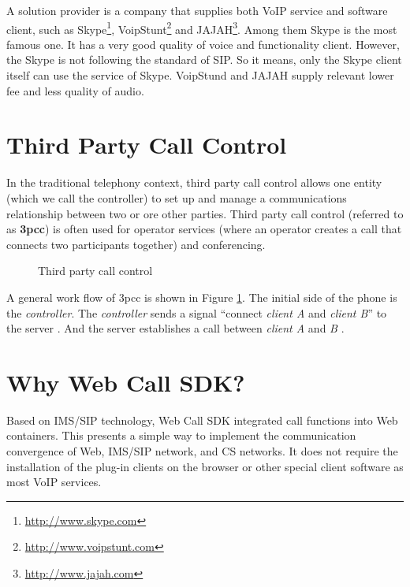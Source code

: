 A solution provider is a company that supplies both VoIP service and software client, such as \textsf{Skype}\texttrademark{}\footnote{\url{http://www.skype.com}}, \textsf{VoipStunt}\footnote{\url{http://www.voipstunt.com}} and JAJAH\footnote{\url{http://www.jajah.com}}.  Among them \textsf{Skype} is the most famous one. It has a very good quality of voice and functionality client. However, the \textsf{Skype} is not following the standard of SIP. So it means, only the \textsf{Skype} client itself can use the service of \textsf{Skype}. \textsf{VoipStund} and \textsf{JAJAH} supply relevant lower fee and less quality of audio.


\section{Third Party Call Control}
\label{sec:BackgroundStudy:ThirdPartyCallControl}

In the traditional telephony context, third party call control allows one entity (which we call the controller) to set up and manage a communications relationship between two or ore other parties.  Third party call control (referred to as \textbf{3pcc}\label{sym:3pcc}) is often used for operator services (where an operator creates a call that connects two participants together) and conferencing.\cite{RFC3725}

\begin{figure}[!hbtp]
\centering
{}
\caption{Third party call control}
\label{fig:ThirdPartyCallControl}
\end{figure}

A general work flow of 3pcc is shown in Figure \ref{fig:ThirdPartyCallControl}. The initial side of the phone is the \textit{controller}. The \textit{controller} sends a signal ``connect \textit{client \nolinebreak A} and \textit{client \nolinebreak B}'' to the server \hyperref[fig:ThirdPartyCallControl]{}. And the server establishes a call between \textit{client A} and \textit{B} \hyperref[fig:ThirdPartyCallControl]{}.


\section{Why Web Call SDK?}
\label{sec:BackgroundStudy:WhyWebCallSDK}

Based on IMS/SIP technology, Web Call SDK integrated call functions into Web containers. This presents a simple way to implement the communication convergence of Web, IMS/SIP network, and CS networks. It does not require the installation of the plug-in clients on the browser or other special client software as most VoIP services.

